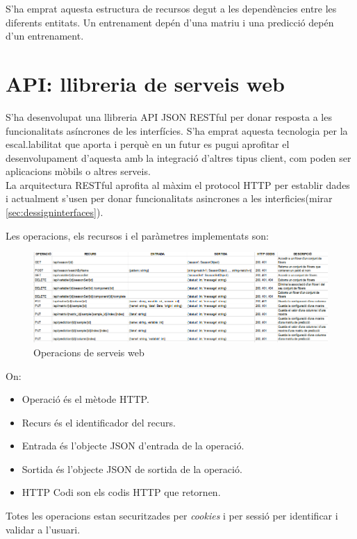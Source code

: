 S'ha emprat aquesta estructura de recursos degut a les dependències entre les diferents entitats. Un entrenament dep\'{e}n d'una matriu i una predicci\'{o} dep\'{e}n d'un entrenament.

\section{API: llibreria de serveis web}
S'ha desenvolupat una llibreria API JSON RESTful per donar resposta a les funcionalitats asíncrones de les interfícies.\cite{apijson} S'ha emprat aquesta tecnologia per la escal.labilitat que aporta i perquè en un futur es pugui aprofitar el desenvolupament d'aquesta amb la integració d'altres tipus client, com poden ser aplicacions mòbils o altres serveis.\\

La arquitectura RESTful aprofita al màxim el protocol HTTP per establir dades i actualment s'usen per donar funcionalitats asincrones a les interficies(mirar \ref{sec:dessigninterfaces}).

Les operacions, els recursos i el paràmetres implementats son:\\
\begin{figure}[H]
  \includegraphics[scale=0.5]{img/implementation/apirestul.png}
  \caption{Operacions de serveis web}
  \label{fig:dessignpatters}
\end{figure}
On:
\begin{itemize}
\item Operació \'{e}s el mètode HTTP.
\item Recurs \'{e}s el identificador del recurs.
\item Entrada \'{e}s l'objecte JSON d'entrada de la operació.
\item Sortida \'{e}s l'objecte JSON de sortida de la operació.
\item HTTP Codi son els codis HTTP que retornen.\cite{listhttpcodis}
\end{itemize}

Totes les operacions estan securitzades per \textit{cookies}\cite{cookies} i per sessió per identificar i validar a l'usuari.\cite{sessions}

